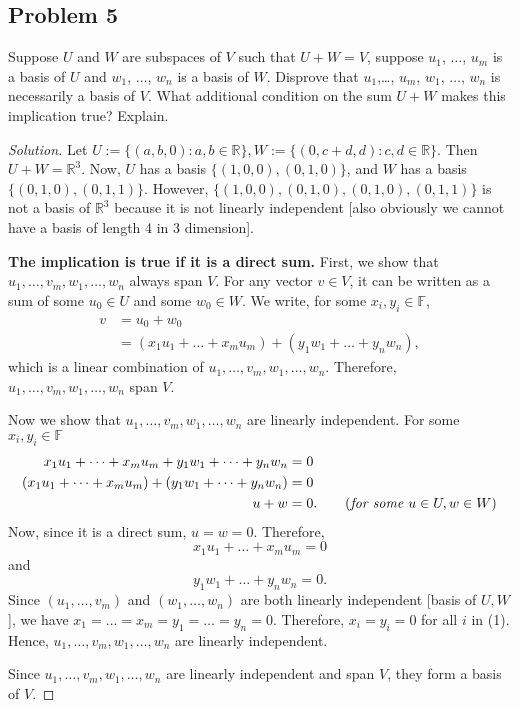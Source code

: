 \documentclass{article}
\begin{document}
\subsection*{Problem 5}
Suppose $U$ and $W$ are subspaces of $V$ such that $U+W=V$, suppose $u_1$, 
$\ldots$, $u_m$ is a basis of $U$ and $w_1$, $\ldots$, $w_n$ is a basis  of $W$. Disprove that 
$u_1$,\ldots, $u_m$, $w_1$, $\ldots$, $w_n$ is necessarily a basis of $V$. What additional 
condition on the sum $U+W$ makes this implication true? Explain.
\begin{proof}[Solution]
    Let $U:=\{(a,b,0):a,b\in\mathbb{R}\}, W:=\{(0,c+d,d):c,d\in\mathbb{R}\}$. Then $U+W=\mathbb{R}^3$.
    Now, $U$ has a basis $\{(1,0,0), (0,1,0)\}$, and $W$ has a basis $\{(0,1,0), (0,1,1)\}$. However,
    $\{(1,0,0), (0,1,0), (0,1,0), (0,1,1)\}$ is not a basis of $\mathbb{R}^3$ because it is not 
    linearly independent [also obviously we cannot have a basis of length 4 in 3 dimension].

    \bigbreak
    \textbf{The implication is true if it is a direct sum. }
    First, we show that $u_1,\dots, v_m, w_1,\dots, w_n$ always span $V$. For any vector $v\in V$, 
    it can be written as a sum of some $u_0\in U$ and some $w_0\in W$. We write, for some 
    $x_i, y_i\in\mathbb{F}$,
    \begin{align*}
        v & = u_0 + w_0 \\
        & = (x_1u_1+\dots+x_mu_m) + (y_1w_1+\dots+y_nw_n),
    \end{align*}
    which is a linear combination of $u_1,\dots, v_m, w_1,\dots, w_n$. Therefore, 
    $u_1,\dots, v_m, w_1,\dots, w_n$ span $V$.

    Now we show that $u_1,\dots, v_m, w_1,\dots, w_n$ are linearly independent. 
    For some $x_i, y_i\in\mathbb{F}$
    \begin{align}
        x_1u_1+\dots+x_mu_m + y_1w_1+\dots+y_nw_n & = 0 \\
        (x_1u_1+\dots+x_mu_m) + (y_1w_1+\dots+y_nw_n) & = 0 \nonumber \\ 
        u + w & = 0. \qquad (\emph{for some } u\in U, w\in W) \nonumber
    \end{align}
    Now, since it is a direct sum, $u=w=0$. Therefore, 
    $$x_1u_1+\dots+x_mu_m = 0$$ and $$y_1w_1+\dots+y_nw_n = 0.$$
    Since $(u_1,\dots, v_m)$ and $(w_1,\dots, w_n)$ are both linearly independent [basis of $U, W$],
    we have $x_1=\dots=x_m=y_1=\dots=y_n=0$. Therefore, $x_i=y_i=0$ for all $i$ in (1). Hence, 
    $u_1,\dots, v_m, w_1,\dots, w_n$ are linearly independent.

    Since $u_1,\dots, v_m, w_1,\dots, w_n$ are linearly independent and span $V$, they form a basis 
    of $V$.
    
\end{proof}
\end{document}
